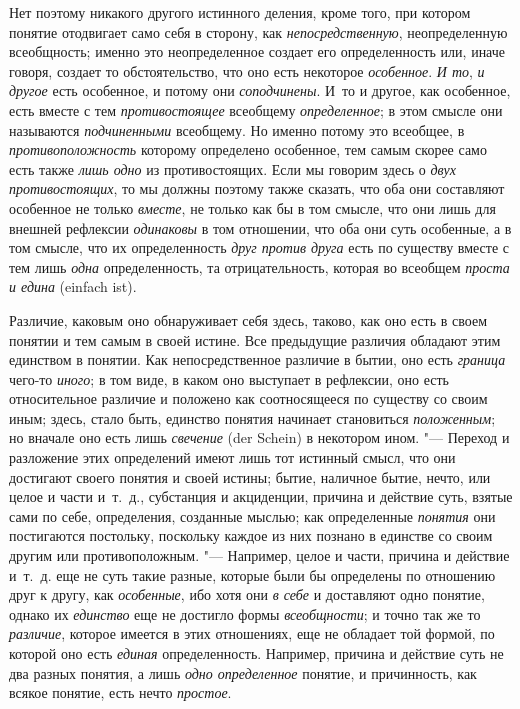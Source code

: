 \label{bkm:bm22a}Нет поэтому никакого другого истинного
деления, кроме того, при котором понятие отодвигает само себя в сторону,
как {\em непосредственную},
неопределенную всеобщность; именно это
неопределенное создает его определенность или, иначе говоря,
создает то обстоятельство, что оно есть некоторое
{\em особенное}.
{\em И то},
{\em и другое} есть
особенное, и потому они
{\em соподчинены}. И~то и
другое, как особенное, есть вместе с тем
{\em противостоящее}
всеобщему
{\em определенное}; в
этом смысле они называются
{\em подчиненными}
всеобщему. Но именно потому это всеобщее, в
{\em противоположность}
которому определено особенное, тем самым скорее само есть
также {\em лишь одно} из
противостоящих. Если мы говорим здесь о
{\em двух противостоящих},
то мы должны поэтому также сказать, что оба они составляют
особенное не только {\em вместе},
не только как бы в том смысле, что они лишь для внешней
рефлексии {\em одинаковы}
в том отношении, что оба они суть особенные, а в том смысле,
что их определенность {\em друг против
друга} есть по существу вместе с тем лишь
{\em одна}
определенность, та отрицательность, которая во всеобщем
{\em проста и едина} (einfach ist).

Различие, каковым оно обнаруживает себя здесь, таково, как оно
есть в своем понятии и тем самым в своей истине. Все предыдущие различия
обладают этим единством в
понятии.
Как непосредственное различие в бытии, оно есть
{\em граница} чего-то
{\em иного}; в том
виде, в каком оно выступает в рефлексии, оно есть относительное различие и
положено как соотносящееся по существу со своим иным; здесь, стало быть,
единство понятия начинает становиться
{\em положенным}; но
вначале оно есть лишь {\em свечение}
(der Schein) в некотором ином. "--- Переход и
разложение этих определений имеют лишь тот истинный смысл, что они
достигают своего понятия и своей истины; бытие, наличное бытие, нечто, или
целое и части и~т.~д., субстанция и акциденции, причина и действие суть,
взятые сами по себе, определения, созданные мыслью; как определенные
{\em понятия} они
постигаются постольку, поскольку каждое из них познано в единстве со своим
другим или противоположным. "--- Например, целое и части,
причина и действие и~т.~д. еще не суть такие разные, которые были бы
определены по отношению друг к другу, как
{\em особенные}, ибо хотя
они {\em в себе} и
доставляют одно понятие, однако их
{\em единство} еще не
достигло формы {\em всеобщности};
и точно так же то
{\em различие}, которое
имеется в этих отношениях, еще не обладает той формой, по которой оно есть
{\em единая}
определенность. Например, причина и действие суть не два
разных понятия, а лишь {\em одно
определенное} понятие, и причинность, как всякое понятие,
есть нечто {\em простое}.

